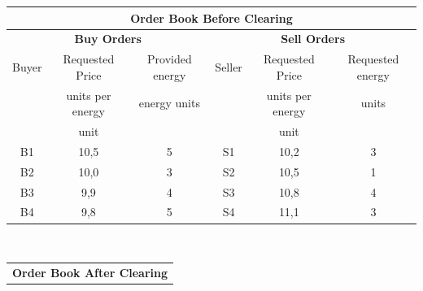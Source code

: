 \begin{table}[h!]
    \begin{minipage}[c]{\textwidth}
        \centering
        \begin{tabular}{|c|c|c|c|c|c|}
            \hline
            \multicolumn{6}{|c|}{\textbf{Order Book Before Clearing}}                                                                                               \\
            \hline
            \multicolumn{3}{|c|}{\textbf{Buy Orders}} & \multicolumn{3}{|c|}{\textbf{Sell Orders}}                                                                  \\
            \hline
            Buyer                                     & Requested Price                            & Provided energy & Seller & Requested Price  & Requested energy \\
                                                      & units per energy                           & energy units    &        & units per energy & units            \\
                                                      & unit                                       &                 &        & unit             &                  \\
            \hline
            B1                                        & 10,5                                       & 5               & S1     & 10,2             & 3                \\
            B2                                        & 10,0                                       & 3               & S2     & 10,5             & 1                \\
            B3                                        & 9,9                                        & 4               & S3     & 10,8             & 4                \\
            B4                                        & 9,8                                        & 5               & S4     & 11,1             & 3                \\
            \hline
        \end{tabular}
    \end{minipage}\\
    \begin{minipage}[c]{\textwidth}
        \centering
        \begin{tabular}{|c|c|c|c|c|c|}
            \hline
            \multicolumn{6}{|c|}{\textbf{Order Book After Clearing}}                                                                                                \\

\end{tabular}
\end{minipage}
\end{table}
